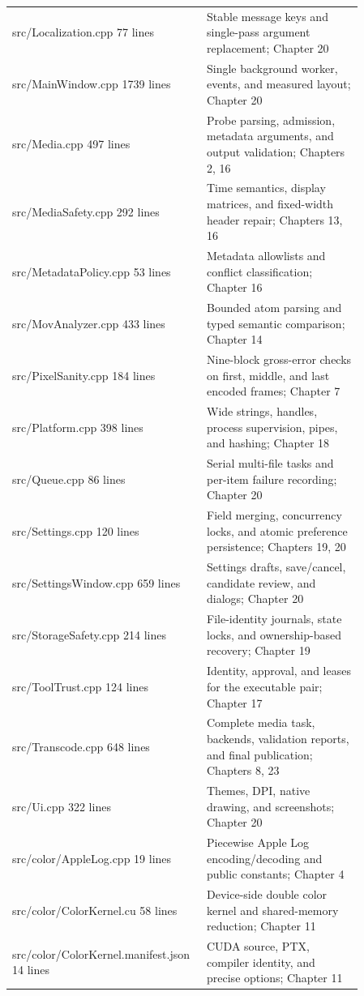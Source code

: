 \documentclass[11pt,a4paper,openany]{book}
\begin{document}
\begin{longtable}{p{0.43\linewidth}p{0.43\linewidth}}
src/Localization.cpp
77 lines & Stable message keys and single-pass argument replacement; Chapter 20\\
src/MainWindow.cpp
1739 lines & Single background worker, events, and measured layout; Chapter 20\\
src/Media.cpp
497 lines & Probe parsing, admission, metadata arguments, and output validation; Chapters 2, 16\\
src/MediaSafety.cpp
292 lines & Time semantics, display matrices, and fixed-width header repair; Chapters 13, 16\\
src/MetadataPolicy.cpp
53 lines & Metadata allowlists and conflict classification; Chapter 16\\
src/MovAnalyzer.cpp
433 lines & Bounded atom parsing and typed semantic comparison; Chapter 14\\
src/PixelSanity.cpp
184 lines & Nine-block gross-error checks on first, middle, and last encoded frames; Chapter 7\\
src/Platform.cpp
398 lines & Wide strings, handles, process supervision, pipes, and hashing; Chapter 18\\
src/Queue.cpp
86 lines & Serial multi-file tasks and per-item failure recording; Chapter 20\\
src/Settings.cpp
120 lines & Field merging, concurrency locks, and atomic preference persistence; Chapters 19, 20\\
src/SettingsWindow.cpp
659 lines & Settings drafts, save/cancel, candidate review, and dialogs; Chapter 20\\
src/StorageSafety.cpp
214 lines & File-identity journals, state locks, and ownership-based recovery; Chapter 19\\
src/ToolTrust.cpp
124 lines & Identity, approval, and leases for the executable pair; Chapter 17\\
src/Transcode.cpp
648 lines & Complete media task, backends, validation reports, and final publication; Chapters 8, 23\\
src/Ui.cpp
322 lines & Themes, DPI, native drawing, and screenshots; Chapter 20\\
src/color/AppleLog.cpp
19 lines & Piecewise Apple Log encoding/decoding and public constants; Chapter 4\\
src/color/ColorKernel.cu
58 lines & Device-side double color kernel and shared-memory reduction; Chapter 11\\
src/color/ColorKernel.manifest.json
14 lines & CUDA source, PTX, compiler identity, and precise options; Chapter 11\\

\end{longtable}
\end{document}
